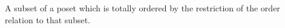 A subset of a poset which is
totally ordered by the restriction of the
order relation to that subset.